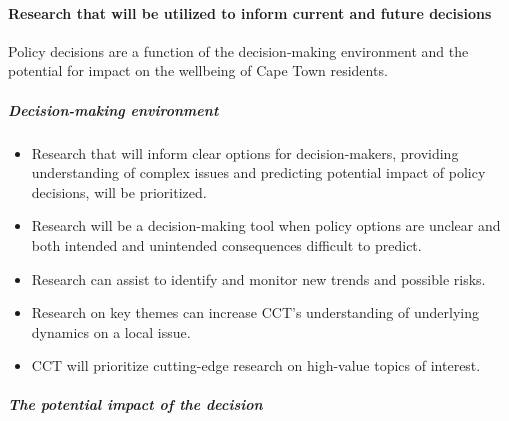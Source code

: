 \documentclass[
]{WileySix}
\providecommand{\tightlist}{%
  \setlength{\itemsep}{0pt}\setlength{\parskip}{0pt}}
\begin{document}
\hypertarget{research-that-will-be-utilized-to-inform-current-and-future-decisions}{%
\paragraph{Research that will be utilized to inform current and future decisions}\label{research-that-will-be-utilized-to-inform-current-and-future-decisions}}

Policy decisions are a function of the decision-making environment and the potential for impact on the wellbeing of Cape Town residents.

\hypertarget{decision-making-environment}{%
\subparagraph{Decision-making environment}\label{decision-making-environment}}

\begin{itemize}
\tightlist
\item
  Research that will inform clear options for decision-makers, providing understanding of complex issues and predicting potential impact of policy decisions, will be prioritized.
\item
  Research will be a decision-making tool when policy options are unclear and both intended and unintended consequences difficult to predict.
\item
  Research can assist to identify and monitor new trends and possible risks.
\item
  Research on key themes can increase CCT's understanding of underlying dynamics on a local issue.
\item
  CCT will prioritize cutting-edge research on high-value topics of interest.
\end{itemize}

\hypertarget{the-potential-impact-of-the-decision}{%
\subparagraph{The potential impact of the decision}\label{the-potential-impact-of-the-decision}}
\end{document}
